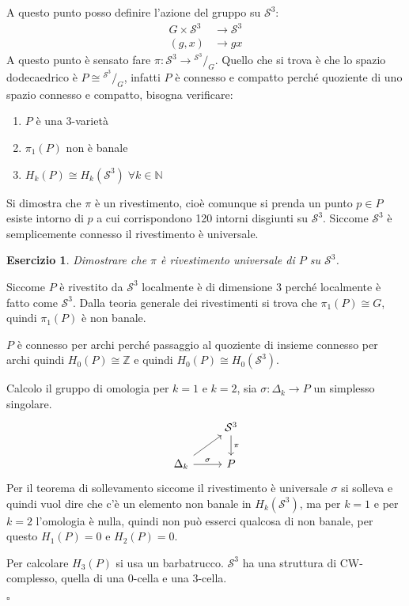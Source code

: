 \documentclass[10pt, twoside=false, x11names]{scrbook}
\newcounter{exercises}
\newtheorem{exercise}[exercises]{Esercizio}
\newenvironment{proof}{{\textbf{Dimostrazione}:}}{\hfill $\square$}
\newcommand{\Z}{\mathbb{Z}}
\newcommand{\Sph}[1][]{\mathcal{S}^#1}
\newcommand*\quot[2]{{^{\textstyle #1}\big/_{\textstyle #2}}}
\begin{document}
\begin{proof}
  A questo punto posso definire l'azione del gruppo su $ \Sph{3} $:
  \begin{align*}
    G \times \Sph{3} & \to \Sph{3} \\
    (g,x) & \to gx
  \end{align*}
  A questo punto è sensato fare $ \pi \colon \Sph{3} \to \quot{\Sph{3}}{G} $.
  Quello che si trova è che lo spazio dodecaedrico è $ P \cong \quot{\Sph{3}}{G} $, infatti
  $ P $ è connesso e compatto perché quoziente di uno spazio connesso e compatto, bisogna
  verificare:
  \begin{enumerate}
  \item $ P $ è una $ 3 $-varietà
  \item $ \pi_1(P) $ non è banale
  \item $ H_k(P) \cong H_k(\Sph{3}) \; \forall k \in \mathbb{N}$
  \end{enumerate}
  Si dimostra che $ \pi $ è un rivestimento, cioè comunque si prenda un punto $ p \in P $
  esiste intorno di $ p $ a cui corrispondono 120 intorni disgiunti su $ \Sph{3} $.
  Siccome $ \Sph{3} $ è semplicemente connesso il rivestimento è universale.
  \begin{exercise}
    Dimostrare che $ \pi $ è rivestimento universale di $ P $ su $ \Sph{3} $.
  \end{exercise}
  Siccome $ P $ è rivestito da $ \Sph{3} $ localmente è di dimensione 3 perché localmente
  è fatto come $ \Sph{3} $.
  Dalla teoria generale dei rivestimenti si trova che $ \pi_1(P) \cong G $, quindi $ \pi_1(P) $ è non banale.

  $ P $ è connesso per archi perché passaggio al quoziente di insieme connesso per archi
  quindi $ H_0(P) \cong \Z $ e quindi $ H_0(P) \cong H_0(\Sph{3}) $.

  Calcolo il gruppo di omologia per $ k = 1 $ e $ k = 2 $, sia $ \sigma \colon \Delta_k \to P $ un
  simplesso singolare.
  \[
    \begin{tikzcd}
      {} & \Sph{3} \dar{\pi} \\
      \Delta_k \rar{\sigma} \arrow{ru}{} & P
    \end{tikzcd}
  \]
  Per il teorema di sollevamento siccome il rivestimento è universale
  $ \sigma $ si solleva e quindi vuol dire che c'è un elemento non banale in $ H_k(\Sph{3}) $,
  ma per $ k = 1 $ e per $ k = 2 $ l'omologia è nulla, quindi non può esserci
  qualcosa di non banale, per questo $ H_1(P) = 0 $ e $ H_2(P) = 0 $.

  Per calcolare $ H_3(P) $ si usa un barbatrucco.
  $ \Sph{3} $ ha una struttura di CW-complesso, quella di una $ 0 $-cella e una $ 3 $-cella.


\end{proof}
\end{document}
